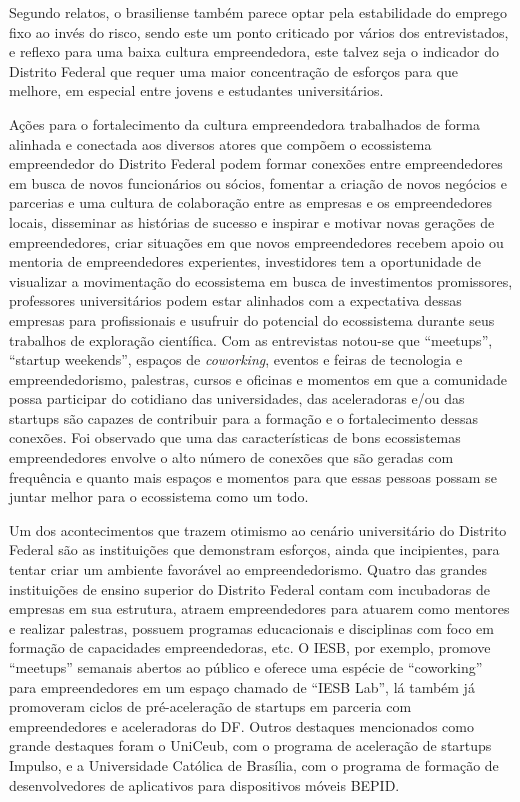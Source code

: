 Segundo relatos, o brasiliense também parece optar pela estabilidade do emprego fixo ao invés do risco, sendo este um ponto criticado por vários dos entrevistados, e reflexo para uma baixa cultura empreendedora, este talvez seja o indicador do Distrito Federal que requer uma maior concentração de esforços para que melhore, em especial entre jovens e estudantes universitários. 

Ações para o fortalecimento da cultura empreendedora trabalhados de forma alinhada e conectada aos diversos atores que compõem o ecossistema empreendedor do Distrito Federal podem formar conexões entre empreendedores em busca de novos funcionários ou sócios, fomentar a criação de novos negócios e parcerias e uma cultura de colaboração entre as empresas e os empreendedores locais, disseminar as histórias de sucesso e inspirar e motivar novas gerações de empreendedores, criar situações em que novos empreendedores recebem apoio ou mentoria de empreendedores experientes, investidores tem a oportunidade de visualizar a movimentação do ecossistema em busca de investimentos promissores, professores universitários podem estar alinhados com a expectativa dessas empresas para profissionais e usufruir do potencial do ecossistema durante seus trabalhos de exploração científica. Com as entrevistas notou-se que ``meetups'', ``startup weekends'', espaços de \textit{coworking}, eventos e feiras de tecnologia e empreendedorismo, palestras, cursos e oficinas e momentos em que a comunidade possa participar do cotidiano das universidades, das aceleradoras e/ou das startups são capazes de contribuir para a formação e o fortalecimento dessas conexões. Foi observado que uma das características de bons ecossistemas empreendedores envolve o alto número de conexões que são geradas com frequência e quanto mais espaços e momentos para que essas pessoas possam se juntar melhor para o ecossistema como um todo.

Um dos acontecimentos que trazem otimismo ao cenário universitário do Distrito Federal são as instituições que demonstram esforços, ainda que incipientes, para tentar criar um ambiente favorável ao empreendedorismo. Quatro das grandes instituições de ensino superior do Distrito Federal contam com incubadoras de empresas em sua estrutura, atraem empreendedores para atuarem como mentores e realizar palestras, possuem programas educacionais e disciplinas com foco em formação de capacidades empreendedoras, etc. O IESB, por exemplo, promove ``meetups'' semanais abertos ao público e oferece uma espécie de ``coworking'' para empreendedores em um espaço chamado de ``IESB Lab'', lá também já promoveram ciclos de pré-aceleração de startups em parceria com empreendedores e aceleradoras do DF. Outros destaques mencionados como grande destaques foram o UniCeub, com o programa de aceleração de startups Impulso, e a Universidade Católica de Brasília, com o programa de formação de desenvolvedores de aplicativos para dispositivos móveis BEPID.

